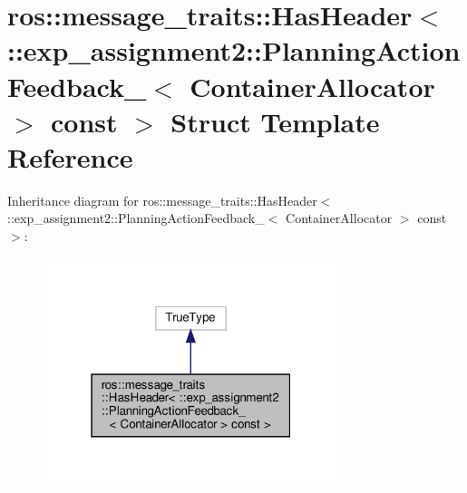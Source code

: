 \hypertarget{structros_1_1message__traits_1_1HasHeader_3_01_1_1exp__assignment2_1_1PlanningActionFeedback___3a9713bd731a514e6e9f9d79c8ccb57b4}{}\section{ros\+:\+:message\+\_\+traits\+:\+:Has\+Header$<$ \+:\+:exp\+\_\+assignment2\+:\+:Planning\+Action\+Feedback\+\_\+$<$ Container\+Allocator $>$ const $>$ Struct Template Reference}
\label{structros_1_1message__traits_1_1HasHeader_3_01_1_1exp__assignment2_1_1PlanningActionFeedback___3a9713bd731a514e6e9f9d79c8ccb57b4}


Inheritance diagram for ros\+:\+:message\+\_\+traits\+:\+:Has\+Header$<$ \+:\+:exp\+\_\+assignment2\+:\+:Planning\+Action\+Feedback\+\_\+$<$ Container\+Allocator $>$ const $>$\+:
\nopagebreak
\begin{figure}[H]
\begin{center}
\leavevmode
\includegraphics[width=244pt]{structros_1_1message__traits_1_1HasHeader_3_01_1_1exp__assignment2_1_1PlanningActionFeedback___32089242251f4b6ca2de8a68b7f1d562f}
\end{center}
\end{figure}


